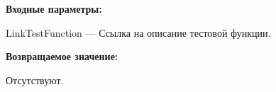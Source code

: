 \textbf{Входные параметры:}

LinkTestFunction --- Ссылка на описание тестовой функции.

\textbf{Возвращаемое значение:}

Отсутствуют.